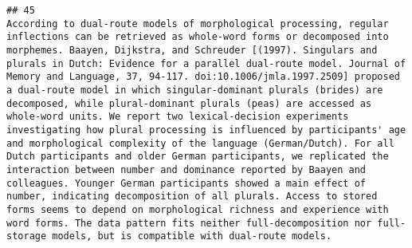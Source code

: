 \documentclass[
  english,
  man]{apa6}
\begin{document}
\begin{verbatim}
## 45                                                                                                                                                                                                                                                                                                                                                                                                                                                                                                                                                                                                                                                                                                                                                                                                                                                                                                                                                                                                                                                                                                                                                                                                                                                                                                                                                                                                                                                                                             According to dual-route models of morphological processing, regular inflections can be retrieved as whole-word forms or decomposed into morphemes. Baayen, Dijkstra, and Schreuder [(1997). Singulars and plurals in Dutch: Evidence for a parallel dual-route model. Journal of Memory and Language, 37, 94-117. doi:10.1006/jmla.1997.2509] proposed a dual-route model in which singular-dominant plurals (brides) are decomposed, while plural-dominant plurals (peas) are accessed as whole-word units. We report two lexical-decision experiments investigating how plural processing is influenced by participants' age and morphological complexity of the language (German/Dutch). For all Dutch participants and older German participants, we replicated the interaction between number and dominance reported by Baayen and colleagues. Younger German participants showed a main effect of number, indicating decomposition of all plurals. Access to stored forms seems to depend on morphological richness and experience with word forms. The data pattern fits neither full-decomposition nor full-storage models, but is compatible with dual-route models.

\end{verbatim}
\end{document}
